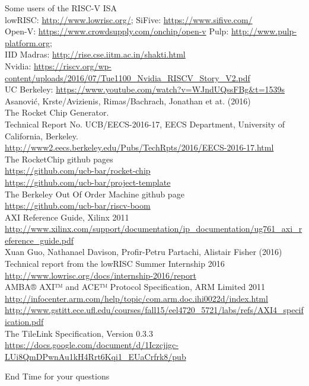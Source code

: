 \documentclass[]{beamer} %
\begin{document}
\tiny
\begin{thebibliography}{9}
		Some users of the RISC-V ISA\\
		lowRISC: \url{http://www.lowrisc.org/}; SiFive: \url{https://www.sifive.com/}\\
		Open-V: \url{https://www.crowdsupply.com/onchip/open-v} Pulp: \url{http://www.pulp-platform.org};\\
		IID Madras: \url{http://rise.cse.iitm.ac.in/shakti.html}\\
		Nvidia: \url{https://riscv.org/wp-content/uploads/2016/07/Tue1100_Nvidia_RISCV_Story_V2.pdf}\\
		UC Berkeley: \url{https://www.youtube.com/watch?v=WJndUQssFBg&t=1539s}\\

		Asanović, Krste/Avizienis, Rimas/Bachrach, Jonathan et at. (2016)\\
		The Rocket Chip Generator.\\
		Technical Report No. UCB/EECS-2016-17, EECS Department, University of California, Berkeley.\\
		\url{http://www2.eecs.berkeley.edu/Pubs/TechRpts/2016/EECS-2016-17.html}\\

		The RocketChip github pages\\
		\url{https://github.com/ucb-bar/rocket-chip}\\
		\url{https://github.com/ucb-bar/project-template}\\

		The Berkeley Out Of Order Machine github page\\
		\url{https://github.com/ucb-bar/riscv-boom}\\

		AXI Reference Guide, Xilinx 2011\\
		\url{http://www.xilinx.com/support/documentation/ip_documentation/ug761_axi_reference_guide.pdf}\\

		Xuan Guo, Nathanael Davison, Profir-Petru Partachi, Alistair Fisher (2016)\\
		Technical report from the lowRISC Summer Internship 2016\\
		\url{http://www.lowrisc.org/docs/internship-2016/report}\\

		AMBA® AXI™ and ACE™ Protocol Specification, ARM Limited 2011\\
		\url{http://infocenter.arm.com/help/topic/com.arm.doc.ihi0022d/index.html}\\
		\url{http://www.gstitt.ece.ufl.edu/courses/fall15/eel4720_5721/labs/refs/AXI4_specification.pdf}\\


		The TileLink Specification, Version 0.3.3\\
		\url{https://docs.google.com/document/d/1Iczcjigc-LUi8QmDPwnAu1kH4Rrt6Kqi1_EUaCrfrk8/pub}

\end{thebibliography}


\begin{frame}{\Huge End}
	\huge Time for your questions
\end{frame}
\end{document}
